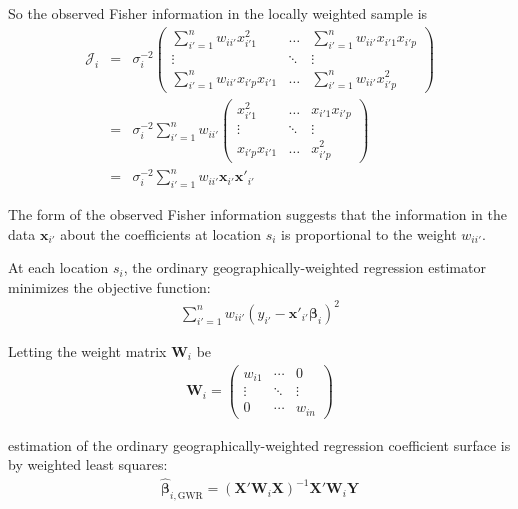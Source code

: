 \documentclass[authoryear, review, 11pt]{elsarticle}
\begin{document}
	So the observed Fisher information in the locally weighted sample is
	\begin{eqnarray}
		\bm{\mathcal{J}}_i &=& \sigma^{-2}_i \left( \begin{array}{ccc} \sum_{i'=1}^n  w_{ii'} x^2_{i'1}   & \dots & \sum_{i'=1}^n w_{ii'} x_{i'1} x_{i'p}   \\ \vdots & \ddots & \vdots \\ \sum_{i'=1}^n  w_{ii'} x_{i'p} x_{i'1}    & \dots & \sum_{i'=1}^n  w_{ii'} x^2_{i'p}  \end{array} \right) \\
		&=& \sigma^{-2}_i \sum_{i'=1}^n w_{ii'}\left( \begin{array}{ccc}  x^2_{i'1} & \dots & x_{i'1} x_{i'p} \\ \vdots & \ddots & \vdots \\ x_{i'p} x_{i'1} & \dots &  x^2_{i'p} \end{array} \right) \\
		&=& \sigma^{-2}_i \sum_{i'=1}^n w_{ii'} \bm{x}_{i'} \bm{x}'_{i'}
	\end{eqnarray}	
	
	The form of the observed Fisher information suggests that the information in the data $\bm{x}_{i'}$ about the coefficients at location $s_i$ is proportional to the weight $w_{ii'}$.
	
	At each location $s_i$, the ordinary geographically-weighted regression estimator minimizes the objective function:
	\begin{eqnarray}
		\sum_{i'=1}^n w_{ii'} \left(y_{i'} - \bm{x}'_{i'} \bm{\beta}_i \right)^2
	\end{eqnarray}
	
	Letting the weight matrix $\bm{W}_i$ be	
	\begin{eqnarray}
		\bm{W}_i =  \left( \begin{array}{ccc} w_{i1} & \cdots & 0 \\ \vdots & \ddots & \vdots \\ 0 & \cdots & w_{in} \end{array} \right)
	\end{eqnarray}
	
	estimation of the ordinary geographically-weighted regression coefficient surface is by weighted least squares:	
	\begin{eqnarray}
		\hat{\bm{\beta}}_{i, \mbox{GWR}} = \left( \bm{X}'\bm{W}_i\bm{X} \right)^{-1} \bm{X}'\bm{W}_i\bm{Y}
	\end{eqnarray}
	
\end{document}
